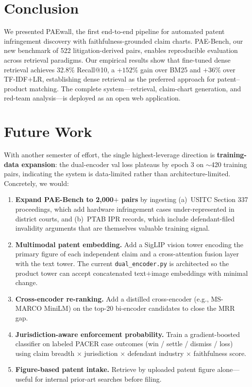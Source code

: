 \documentclass[11pt]{article}
\begin{document}
\section{Conclusion}

We presented PAEwall, the first end-to-end pipeline for automated patent infringement discovery with faithfulness-grounded claim charts. PAE-Bench, our new benchmark of 522 litigation-derived pairs, enables reproducible evaluation across retrieval paradigms. Our empirical results show that fine-tuned dense retrieval achieves 32.8\% Recall@10, a $+152\%$ gain over BM25 and $+36\%$ over TF-IDF$+$LR, establishing dense retrieval as the preferred approach for patent--product matching. The complete system---retrieval, claim-chart generation, and red-team analysis---is deployed as an open web application.

\section{Future Work}

With another semester of effort, the single highest-leverage direction is \textbf{training-data expansion}: the dual-encoder val loss plateaus by epoch 3 on $\sim$420 training pairs, indicating the system is data-limited rather than architecture-limited. Concretely, we would:

\begin{enumerate}
    \item \textbf{Expand PAE-Bench to 2{,}000$+$ pairs} by ingesting (a)~USITC Section 337 proceedings, which add hardware infringement cases under-represented in district courts, and (b)~PTAB IPR records, which include defendant-filed invalidity arguments that are themselves valuable training signal.
    \item \textbf{Multimodal patent embedding.} Add a SigLIP vision tower encoding the primary figure of each independent claim and a cross-attention fusion layer with the text tower. The current \texttt{dual\_encoder.py} is architected so the product tower can accept concatenated text$+$image embeddings with minimal change.
    \item \textbf{Cross-encoder re-ranking.} Add a distilled cross-encoder (e.g., MS-MARCO MiniLM) on the top-20 bi-encoder candidates to close the MRR gap.
    \item \textbf{Jurisdiction-aware enforcement probability.} Train a gradient-boosted classifier on labeled PACER case outcomes (win / settle / dismiss / loss) using claim breadth $\times$ jurisdiction $\times$ defendant industry $\times$ faithfulness score.
    \item \textbf{Figure-based patent intake.} Retrieve by uploaded patent figure alone---useful for internal prior-art searches before filing.
\end{enumerate}
\end{document}
